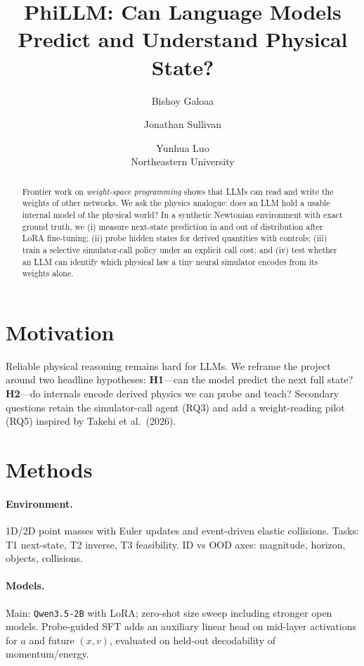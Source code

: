 \documentclass{article}
\title{PhiLLM: Can Language Models Predict and Understand Physical State?}
\author{
  Bishoy Galoaa \and Jonathan Sullivan \and Yunhua Luo \\
  Northeastern University
}
\begin{document}
\maketitle

\begin{abstract}
Frontier work on \emph{weight-space programming} shows that LLMs can read and write the weights of other networks.
We ask the physics analogue: does an LLM hold a usable internal model of the physical world?
In a synthetic Newtonian environment with exact ground truth, we (i) measure next-state prediction in and out of distribution after LoRA fine-tuning;
(ii) probe hidden states for derived quantities with controls;
(iii) train a selective simulator-call policy under an explicit call cost;
and (iv) test whether an LLM can identify which physical law a tiny neural simulator encodes from its weights alone.
\end{abstract}

\section{Motivation}
Reliable physical reasoning remains hard for LLMs.
We reframe the project around two headline hypotheses:
\textbf{H1}---can the model predict the next full state?
\textbf{H2}---do internals encode derived physics we can probe and teach?
Secondary questions retain the simulator-call agent (RQ3) and add a weight-reading pilot (RQ5) inspired by Takehi et al.\ (2026).

\section{Methods}
\paragraph{Environment.} 1D/2D point masses with Euler updates and event-driven elastic collisions.
Tasks: T1 next-state, T2 inverse, T3 feasibility.
ID vs OOD axes: magnitude, horizon, objects, collisions.

\paragraph{Models.} Main: \texttt{Qwen3.5-2B} with LoRA; zero-shot size sweep including stronger open models.
Probe-guided SFT adds an auxiliary linear head on mid-layer activations for $a$ and future $(x,v)$, evaluated on held-out decodability of momentum/energy.
\end{document}
